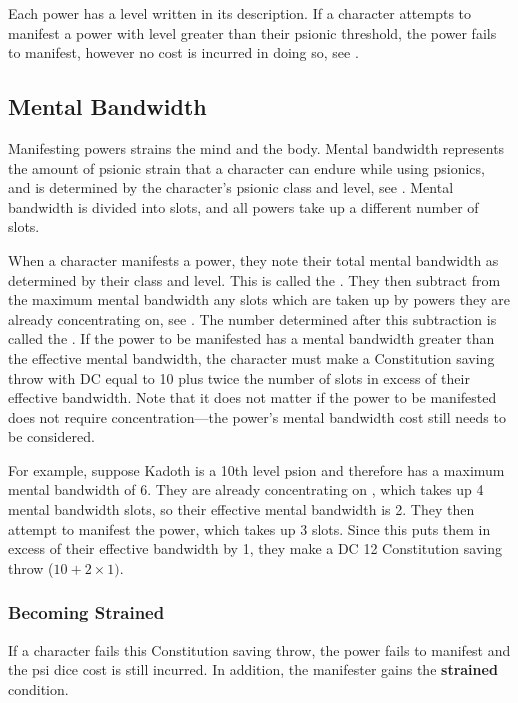 Each power has a level written in its description.
If a character attempts to manifest a power with level
greater than their psionic threshold,
the power fails to manifest,
however no cost is incurred in doing so,
see .

\subsection{Mental Bandwidth}
Manifesting powers strains the mind and the body.
Mental bandwidth represents the amount of psionic strain that
a character can endure while using psionics,
and is determined by the character's psionic class and level,
see .
Mental bandwidth is divided into slots,
and all powers take up a different number of slots.

When a character manifests a power,
they note their total mental bandwidth
as determined by their class and level.
This is called the
.
They then subtract from the maximum mental bandwidth
any slots which are taken up by powers they are already concentrating on,
see .
The number determined after this subtraction is called the
.
If the power to be manifested has a mental bandwidth
greater than the effective mental bandwidth,
the character must make a Constitution saving throw with
DC equal to 10 plus twice the number of slots
in excess of their effective bandwidth.
Note that it does not matter if the power to be manifested
does not require concentration---the power's mental bandwidth cost
still needs to be considered.

For example,
suppose Kadoth is a 10th level psion
and therefore has a maximum mental bandwidth of 6.
They are already concentrating on ,
which takes up 4 mental bandwidth slots,
so their effective mental bandwidth is 2.
They then attempt to manifest the  power,
which takes up 3 slots.
Since this puts them in excess of their effective bandwidth by 1,
they make a DC 12 Constitution saving throw ($10 + 2 \times 1)$.

\subsubsection{Becoming Strained}
If a character fails this Constitution saving throw,
the power fails to manifest
and the psi dice cost is still incurred.
In addition, the manifester gains the \textbf{strained} condition.

